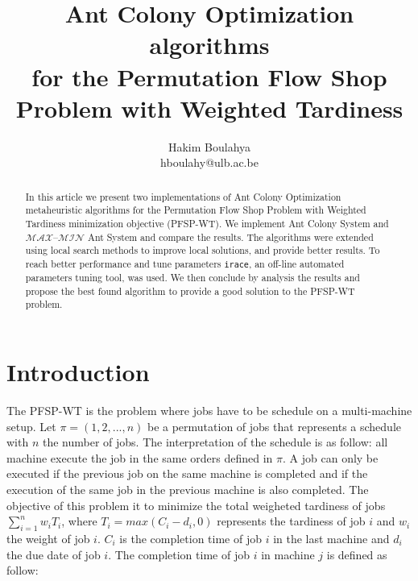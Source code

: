 \documentclass[runningheads]{llncs}
\begin{document}
\title{Ant Colony Optimization algorithms \\
for the Permutation Flow Shop Problem with Weighted Tardiness}
\subtitle{}


\author{Hakim Boulahya \\
hboulahy@ulb.ac.be}



\maketitle

\begin{abstract}
In this article we present two implementations of Ant Colony Optimization metaheuristic algorithms for the
Permutation Flow Shop Problem with Weighted Tardiness minimization objective (PFSP-WT). We implement Ant Colony System and $\mathcal{MAX – MIN}$ Ant System and compare the results. The algorithms were extended using local search methods to improve local solutions, and provide better results. To reach better performance and tune parameters \texttt{irace},
an off-line automated parameters tuning tool, was used. We then conclude by analysis the results
and propose the best found algorithm to provide a good solution to the PFSP-WT problem.

\end{abstract}

\section{Introduction}

The PFSP-WT is the problem where jobs have to be schedule on a multi-machine setup. Let $\pi = (1, 2, ..., n)$ be a permutation of jobs that represents a schedule with $n$ the number of jobs. The interpretation of the schedule is as follow: all machine execute the job in the same orders defined in $\pi$. A job can only be executed if the previous job on the same machine is completed and if the execution of the same job in the previous machine is also completed. The objective of this problem it to minimize the total weigheted tardiness of jobs $\sum_{i=1}^{n}{w_i T_i}$, where $T_i = max(C_i - d_i, 0)$ represents the tardiness of job $i$ and $w_i$ the weight of job $i$. $C_i$ is the completion time of job $i$ in the last machine and $d_i$ the due date of job $i$. The completion time of job $i$ in machine $j$ is defined as follow:
\end{document}
